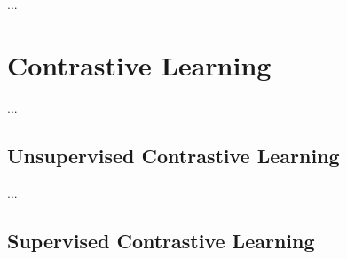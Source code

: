 ...

\section{Contrastive Learning}


...

\subsection{Unsupervised Contrastive Learning}


...

\subsection{Supervised Contrastive Learning}

